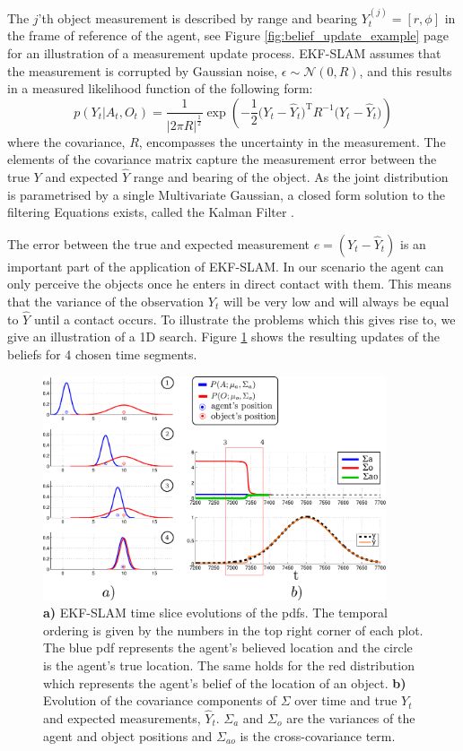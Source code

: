 The $j$'th object measurement is described by range and bearing  $Y^{(j)}_t = [r,\phi]$ in the frame of reference of the agent,
see Figure \ref{fig:belief_update_example} page \pageref{fig:belief_update_example} for an illustration of a measurement update process.
EKF-SLAM assumes that the measurement is corrupted by Gaussian noise, $\epsilon \sim \mathcal{N}(0,R)$,
and this results in a measured likelihood function of the following form:
\begin{equation} \label{eq:lik-measurement}
   p(Y_t|A_t,O_t) = \frac{1}{|2\pi R|^{\frac{1}{2}}} \exp \left( -\frac{1}{2} \big(Y_t - \hat{Y}_t\big)^{\mathrm{T}}R^{-1}\big(Y_t - \hat{Y}_t\big) \right)
\end{equation}
where the covariance, $R$, encompasses the uncertainty in the measurement. The elements of the covariance matrix capture 
the measurement error between the true $Y$ and expected $\hat{Y}$ range and bearing of the object. As the joint distribution 
is parametrised by a single Multivariate Gaussian, a closed form solution to the filtering Equations exists, called the Kalman 
Filter \cite{SLAM_part1}. 

The error between the true and expected measurement $e = (Y_t - \hat{Y}_t)$ is an important part of the application of EKF-SLAM.
In our scenario the agent can only perceive the objects once he enters in direct contact with them. 
This means that the variance of the observation $Y_t$ will be very low and will always be equal to $\hat{Y}$ until a contact occurs. 
To illustrate the problems which this gives rise to, we give an illustration of a 1D search. Figure \ref{fig:EKF-SLAM} shows the 
resulting updates of the beliefs for 4 chosen time segments.

\begin{figure}
\centering
 \includegraphics[width=0.9\textwidth]{./ch5-MLMF/Figures/Figure34.pdf}
\caption{\textbf{a)} EKF-SLAM time slice evolutions of the pdfs. 
The temporal ordering is given by the numbers in the top right corner of each plot.
The blue pdf represents the agent's believed location and the circle is the agent's true location. The same holds 
for the red distribution which represents the agent's belief of the location of an object.
\textbf{b)} Evolution of the covariance components of $\Sigma$ over time and true $Y_t$ and expected measurements,  $\hat{Y}_t$. 
$\Sigma_a$ and $\Sigma_o$ are the variances of the agent and object positions and $\Sigma_{ao}$ is the cross-covariance 
term.}
\label{fig:EKF-SLAM}
\end{figure}

